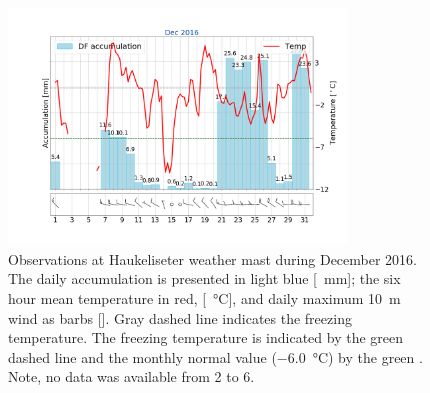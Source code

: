 \begin{figure}[t]
	\centering
	\includegraphics[trim={4.cm 3.3cm 1.5cm 3.cm},clip,
	width=0.8\textwidth]{./fig_weathermast/T_P_U_201612}
	\caption{Observations at Haukeliseter weather mast during December 2016. 
    The daily accumulation is presented in light blue [\SI{}{\mm}]; the six hour mean temperature in red, [\SI{}{\celsius}], and daily maximum \SI{10}{\metre} wind as barbs [\SI{}{\mPs}]. Gray dashed line indicates the freezing temperature. The freezing temperature is indicated by the green dashed line and the monthly normal value (\SI{-6.0}{\celsius}) by the green \citet{eklima_norwegian_2016}. Note, no data was available from \num{2} to \SI{6}{\dec}.} \label{fig:DecObs}
\end{figure}